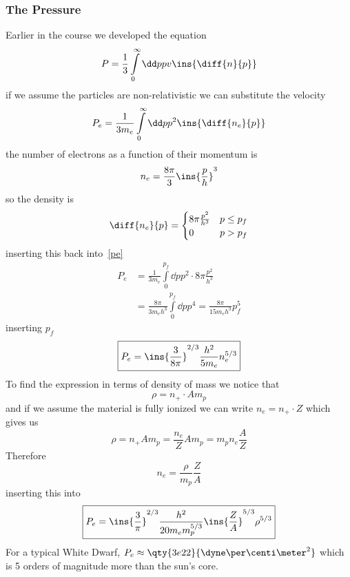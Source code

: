\subsubsection{The Pressure}
Earlier in the course we developed the equation
\begin{equation}\label{p_pre_assumption}
    P = \frac{1}{3}\int\limits_0^\infty \dd p pv\ins{\diff{n}{p}}
\end{equation}
if we assume the particles are non-relativistic we can substitute the velocity
\begin{equation}\label{pe}
    P_e = \frac{1}{3m_e}\int\limits_0^\infty \dd p p^2 \ins{\diff{n_e}{p}}
\end{equation}
the number of electrons as a function of their momentum is
\begin{equation}
    n_e = \frac{8\pi}{3}\ins{\frac{p}{h}}^3
\end{equation}
so the density is
\begin{equation}
    \diff{n_e}{p} = \begin{cases}
        8\pi\frac{p^2}{h^3} & p \leq p_f \\
        0 & p > p_f
    \end{cases}
\end{equation}
inserting this back into~\ref{pe}
\begin{align}\label{pe2}
    P_e &= \frac{1}{3m_e}\int\limits_0^{p_f}\dd p p^2\cdot 8\pi\frac{p^2}{h^3}\\
    &= \frac{8\pi}{3m_e h^3}\int\limits_0^{p_f}\dd p p^4 = \frac{8\pi}{15m_e h^3}p_f^5
\end{align}
inserting \(p_f\)
\begin{equation}
    \boxed{P_e = \ins{\frac{3}{8\pi}}^{2/3}\frac{h^2}{5m_e}n_e^{5/3}}
\end{equation}
To find the expression in terms of density of mass we notice that
\begin{equation}
    \rho = n_+ \cdot Am_p
\end{equation}
and if we assume the material is fully ionized we can write \(n_e = n_+ \cdot Z\) which gives us
\begin{equation}
    \rho = n_+ Am_p = \frac{n_e}{Z}Am_p = m_p n_e \frac{A}{Z}
\end{equation}
Therefore
\begin{equation}
    \boxed{n_e = \frac{\rho}{m_p}\frac{Z}{A}}
\end{equation}
inserting this into 
\begin{equation}
    \boxed{P_e = \ins{\frac{3}{\pi}}^{2/3}\frac{h^2}{20m_e m_p^{5/3}}\ins{\frac{Z}{A}}^{5/3}\rho^{5/3}}
\end{equation}
For a typical White Dwarf, \(P_e \approx \qty{3e22}{\dyne\per\centi\meter^2}\) which is 5 orders of magnitude more than the sun's core.
